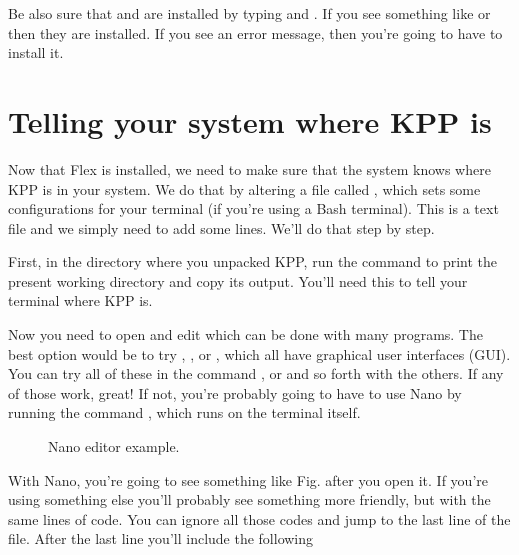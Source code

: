 \documentclass[letterpaper,10pt,openany,oneside]{sphinxmanual}
\begin{document}
Be also sure that  and  are installed by typing 
and . If you see something like  or
 then they are installed. If you see an error message, then
you're going to have to install it.


\section{Telling your system where KPP is}
\label{compiling:telling-your-system-where-kpp-is}
Now that Flex is installed, we need to make sure that the system knows where KPP
is in your system. We do that by altering a file called , which
sets some configurations for your terminal (if you're using a Bash terminal).
This is a text file and we simply need to add some lines. We'll do that step by step.

First, in the directory where you unpacked KPP, run the command  to
print the present working directory and copy its output. You'll need this to
tell your terminal where KPP is.

Now you need to open and edit  which can be done with many programs.
The best option would be to try , ,  or ,
which all have graphical user interfaces (GUI). You can try all of these in the
command , or  and so forth with the
others. If any of those work, great! If not, you're probably going to have to
use Nano by running the command , which runs on the terminal
itself.
\begin{figure}[htbp]
\centering
\capstart

\noindent{}
\caption{Nano editor example.}\label{compiling:nano-ex}\label{compiling:id1}\end{figure}

With Nano, you're going to see something like Fig. {\hyperref[compiling:nano\string-ex]{}} after you
open it. If you're using something else you'll probably see something more
friendly, but with the same lines of code. You can ignore all those codes and
jump to the last line of the file. After the last line you'll include the
following
\end{document}
